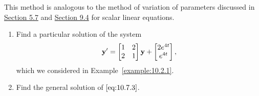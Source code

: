 \documentclass{ximera}
\begin{document}
This method is analogous
to the method of variation of parameters discussed in
\href{https://xerxes.ximera.org/differentialequations/main/variationOfParameters/variationOfParameters}{Section 5.7} and \href{https://xerxes.ximera.org/differentialequations/main/varParHigherOrder/varParHigherOrder}{Section 9.4} for scalar linear
equations.

\begin{example}\label{example:10.7.1} 
\begin{enumerate}
\item\label{item:10.7.1a} %
Find a particular solution of the system
\begin{equation} \label{eq:10.7.3}
{\bf y}'=\begin{bmatrix}1&2\\2&1\end{bmatrix}{\bf y}+\begin{bmatrix}2e^{4t}\\e^{4t}
\end{bmatrix},
\end{equation}
which we considered in Example~\ref{example:10.2.1}.
\item\label{item:10.7.1b} %
Find the general solution of  $\eqref{eq:10.7.3}$.
\end{enumerate}


\end{example}
\end{document}
